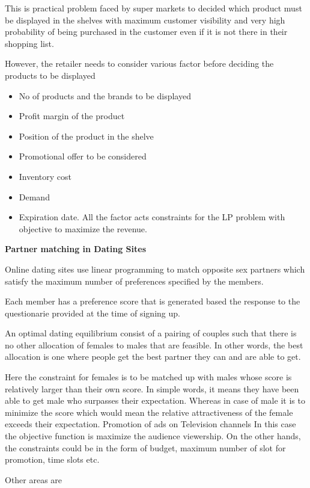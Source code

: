 \documentclass[]{article}
\providecommand{\tightlist}{%
  \setlength{\itemsep}{0pt}\setlength{\parskip}{0pt}}
\begin{document}
This is practical problem faced by super markets to decided which
product must be displayed in the shelves with maximum customer
visibility and very high probability of being purchased in the customer
even if it is not there in their shopping list.

However, the retailer needs to consider various factor before deciding
the products to be displayed

\begin{itemize}
\tightlist
\item
  No of products and the brands to be displayed
\item
  Profit margin of the product
\item
  Position of the product in the shelve
\item
  Promotional offer to be considered
\item
  Inventory cost
\item
  Demand
\item
  Expiration date. All the factor acts constraints for the LP problem
  with objective to maximize the revenue.
\end{itemize}

\textbf{Partner matching in Dating Sites}

Online dating sites use linear programming to match opposite sex
partners which satisfy the maximum number of preferences specified by
the members.

Each member has a preference score that is generated based the response
to the questionarie provided at the time of signing up.

An optimal dating equilibrium consist of a pairing of couples such that
there is no other allocation of females to males that are feasible. In
other words, the best allocation is one where people get the best
partner they can and are able to get.

Here the constraint for females is to be matched up with males whose
score is relatively larger than their own score. In simple words, it
means they have been able to get male who surpasses their expectation.
Whereas in case of male it is to minimize the score which would mean the
relative attractiveness of the female exceeds their expectation.
Promotion of ads on Television channels In this case the objective
function is maximize the audience viewership. On the other hands, the
constraints could be in the form of budget, maximum number of slot for
promotion, time slots etc.

Other areas are
\end{document}

